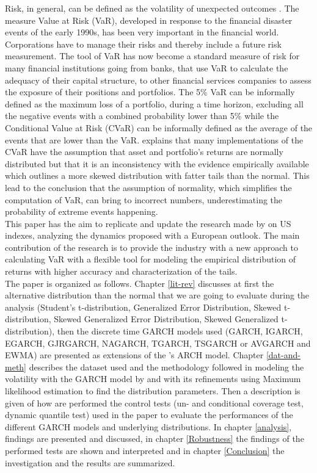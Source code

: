 \documentclass[a4paper, twoside]{templates/ociamthesis}
\begin{document}
Risk, in general, can be defined as the volatility of unexpected outcomes \autocite{jorion2007}. The measure Value at Risk (VaR), developed in response to the financial disaster events of the early 1990s, has been very important in the financial world. Corporations have to manage their risks and thereby include a future risk measurement. The tool of VaR has now become a standard measure of risk for many financial institutions going from banks, that use VaR to calculate the adequacy of their capital structure, to other financial services companies to assess the exposure of their positions and portfolios. The 5\% VaR can be informally defined as the maximum loss of a portfolio, during a time horizon, excluding all the negative events with a combined probability lower than 5\% while the Conditional Value at Risk (CVaR) can be informally defined as the average of the events that are lower than the VaR. \textcite{bali2008} explains that many implementations of the CVaR have the assumption that asset and portfolio's returns are normally distributed but that it is an inconsistency with the evidence empirically available which outlines a more skewed distribution with fatter tails than the normal. This lead to the conclusion that the assumption of normality, which simplifies the computation of VaR, can bring to incorrect numbers, underestimating the probability of extreme events happening.~\\

This paper has the aim to replicate and update the research made by \textcite{bali2008} on US indexes, analyzing the dynamics proposed with a European outlook. The main contribution of the research is to provide the industry with a new approach to calculating VaR with a flexible tool for modeling the empirical distribution of returns with higher accuracy and characterization of the tails.~\\

The paper is organized as follows. Chapter \ref{lit-rev} discusses at first the alternative distribution than the normal that we are going to evaluate during the analysis (Student's t-distribution, Generalized Error Distribution, Skewed t-distribution, Skewed Generalized Error Distribution, Skewed Generalized t-distribution), then the discrete time GARCH models used (GARCH, IGARCH, EGARCH, GJRGARCH, NAGARCH, TGARCH, TSGARCH or AVGARCH and EWMA) are presented as extensions of the \textcite{engle1982} 's ARCH model. Chapter \ref{dat-and-meth} describes the dataset used and the methodology followed in modeling the volatility with the GARCH model by \textcite{bollerslev1986} and with its refinements using Maximum likelihood estimation to find the distribution parameters. Then a description is given of how are performed the control tests (un- and conditional coverage test, dynamic quantile test) used in the paper to evaluate the performances of the different GARCH models and underlying distributions. In chapter \ref{analysis}, findings are presented and discussed, in chapter \ref{Robustness} the findings of the performed tests are shown and interpreted and in chapter \ref{Conclusion} the investigation and the results are summarized.
\end{document}
